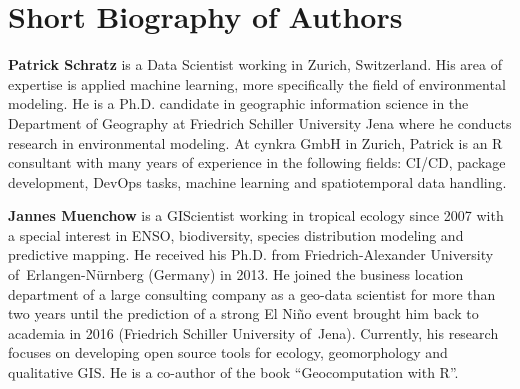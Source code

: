 \documentclass[remotesensing,article,submit,moreauthors,pdftex]{Definitions/mdpi}
\begin{document}
\section*{Short Biography of Authors}
\bio
{}
{\textbf{Patrick Schratz} is a Data Scientist working in Zurich, Switzerland.
	His area of expertise is applied machine learning, more specifically the field of environmental modeling.
	He is a Ph.D. candidate in geographic information science in the Department of Geography at Friedrich Schiller University Jena where he conducts research in environmental modeling.
	At cynkra GmbH in Zurich, Patrick is an R consultant with many years of experience in the following fields: CI/CD, package development, DevOps tasks, machine learning and spatiotemporal data handling.}

\bio
{}
{\textbf{Jannes Muenchow} is a GIScientist working in tropical ecology since 2007 with a special interest in ENSO, biodiversity, species distribution modeling and predictive mapping.
	He received his Ph.D. from Friedrich-Alexander University of\ Erlangen-Nürnberg (Germany) in 2013.
	He joined the business location department of a large consulting company as a geo-data scientist for more than two years until the prediction of a strong El Niño event brought him back to academia in 2016 (Friedrich Schiller University of\ Jena).
	Currently, his research focuses on developing open source tools for ecology, geomorphology and qualitative GIS.
	He is a co-author of the book ``Geocomputation with R''.}
\end{document}
